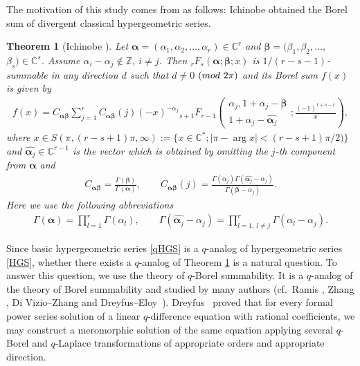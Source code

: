 \documentclass[11pt]{article}
\numberwithin{equation}{section}
\newtheorem{Theorem}{Theorem}[section]
\begin{document}
The motivation of this study comes from as follows: Ichinobe \cite{Ichinobe2001} obtained the Borel sum of divergent classical hypergeometric series.
\begin{Theorem}[Ichinobe {\cite[Theorem 2.1]{Ichinobe2001}}]\label{Theorem:Ichinobe}
Let $\bm{\alpha}=(\alpha_1,\alpha_2,\ldots,\alpha_r)\in\mathbb{C}^r$ and $\bm{\beta}=(\beta_1,\beta_2,\ldots,$ $\beta_s)\in\mathbb{C}^s$. Assume $\alpha_i-\alpha_j\notin\mathbb{Z}$, $i\neq j$. Then ${}_rF_s(\bm{\alpha};\bm{\beta};x)$ is $1/(r-s-1)$-summable in any direction $d$ such that $d\neq0$ $({\rm mod}~2\pi)$ and its Borel sum $f(x)$ is given by
\begin{gather*}\label{Ichinobe_result1}
f(x)=C_{\bm{\alpha\beta}}\sum_{j=1}^rC_{\bm{\alpha\beta}}(j)(-x)^{-\alpha_j}{}_{s+1}F_{r-1}\left( \begin{matrix}
\alpha_j,1+\alpha_j-\bm{\beta}\\
1+\alpha_j-\widehat{\bm{\alpha}_j}
\end{matrix}
;\frac{(-1)^{1+s-r}}{x}\right),
\end{gather*}
where $x\in S(\pi,(r-s+1)\pi,\infty):=\{x\in\mathbb{C}^*;\left|\pi-\arg x\right|<(r-s+1)\pi/2)\}$ and $\widehat{\bm{\alpha}_j}\in\mathbb{C}^{r-1}$ is the vector which is obtained by omitting the $j$-th component from $\bm{\alpha}$ and
\begin{gather}\label{Ichinobe_result2}
C_{\bm{\alpha\beta}}=\frac{\Gamma(\bm{\beta})}{\Gamma(\bm{\alpha})},\qquad C_{\bm{\alpha\beta}}(j)=\frac{\Gamma(\alpha_j)\Gamma(\widehat{\bm{\alpha}_j}-\alpha_j)}{\Gamma(\bm{\beta}-\alpha_j)}.
\end{gather}
Here we use the following abbreviations
\begin{gather*}
\Gamma(\bm{\alpha})=\prod_{l=1}^r\Gamma(\alpha_l),\qquad \Gamma(\widehat{\bm{\alpha}_j}-\alpha_j)=\prod_{l=1,\,l\neq j}^r\Gamma(\alpha_l-\alpha_j).
\end{gather*}
\end{Theorem}
Since basic hypergeometric series \eqref{qHGS} is a $q$-analog of hypergeometric series \eqref{HGS}, whether there exists a $q$-analog of Theorem \ref{Theorem:Ichinobe} is a natural question. To answer this question, we use the theory of $q$-Borel summability. It is a $q$-analog of the theory of Borel summability and studied by many authors (cf.~Ramis \cite{Ramis1992}, Zhang \cite{Zhang2002,Zhang2005}, Di Vizio--Zhang \cite{Vizio-Zhang} and Dreyfus--Eloy~\cite{DreyfusEloy2016}). Dreyfus~\cite{Dreyfus2015_1} proved that for every formal power series solution of a linear $q$-difference equation with rational coefficients, we may construct a meromorphic solution of the same equation applying several $q$-Borel and $q$-Laplace transformations of appropriate orders and appropriate direction.
\end{document}
